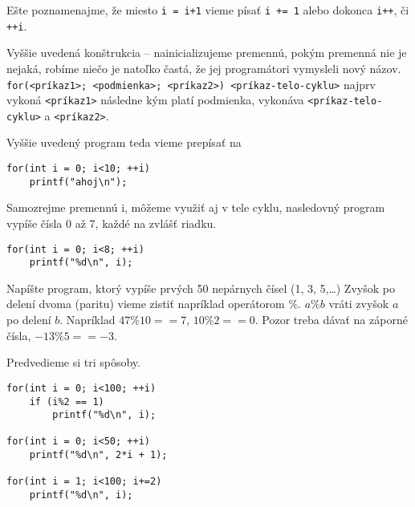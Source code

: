 Ešte poznamenajme, že miesto \verb!i = i+1! vieme písať \verb!i += 1! alebo
dokonca \verb!i++!, či \verb!++i!.

\medskip

Vyššie uvedená konštrukcia -- nainicializujeme premennú, pokým premenná nie je
nejaká, robíme niečo je natoľko častá, že jej programátori vymysleli nový
názov. \verb!for(<príkaz1>; <podmienka>; <príkaz2>) <príkaz-telo-cyklu>! najprv
vykoná \verb!<príkaz1>! následne kým platí podmienka, vykonáva
\verb!<príkaz-telo-cyklu>! a \verb!<príkaz2>!.

Vyššie uvedený program teda vieme prepísať na
\begin{lstlisting}
for(int i = 0; i<10; ++i)
    printf("ahoj\n");
\end{lstlisting}

Samozrejme premennú i, môžeme využiť aj v tele cyklu, nasledovný program vypíše
čísla 0 až 7, každé na zvlášť riadku.
\begin{lstlisting}
for(int i = 0; i<8; ++i)
    printf("%d\n", i);
\end{lstlisting}

 Napíšte program, ktorý vypíše prvých 50 nepárnych čísel (1, 3,
5,\dots) Zvyšok po delení dvoma (paritu) vieme zistiť napríklad operátorom \%.
$a \% b$ vráti zvyšok $a$ po delení $b$. Napríklad $47 \% 10 == 7$, $10 \% 2 ==
0$. Pozor treba dávať na záporné čísla, $-13 \% 5 == -3$.

 Predvedieme si tri spôsoby. 
\begin{lstlisting}
for(int i = 0; i<100; ++i)
    if (i%2 == 1)
        printf("%d\n", i);

for(int i = 0; i<50; ++i)
    printf("%d\n", 2*i + 1);

for(int i = 1; i<100; i+=2)
    printf("%d\n", i);
\end{lstlisting}
















